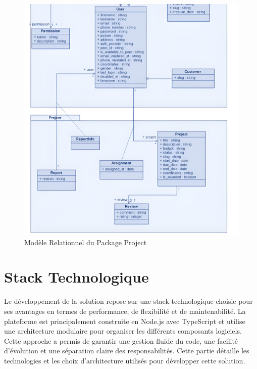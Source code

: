 \begin{figure}[H]
\begin{center}
\includegraphics[width=15cm]{assets/diagrams/ProjectUC.png}
\end{center}
\caption{Modèle Relationnel du Package Project}
\end{figure}

\vspace{0.35cm}

\newpage

\section{Stack Technologique}
Le développement de la solution repose sur une stack technologique choisie pour ses avantages en termes de performance, de flexibilité et de maintenabilité. La plateforme est principalement construite en Node.js avec TypeScript et utilise une architecture modulaire pour organiser les différents composants logiciels. Cette approche a permis de garantir une gestion fluide du code, une facilité d'évolution et une séparation claire des responsabilités. Cette partie détaille les technologies et les choix d'architecture utilisés pour développer cette solution.


